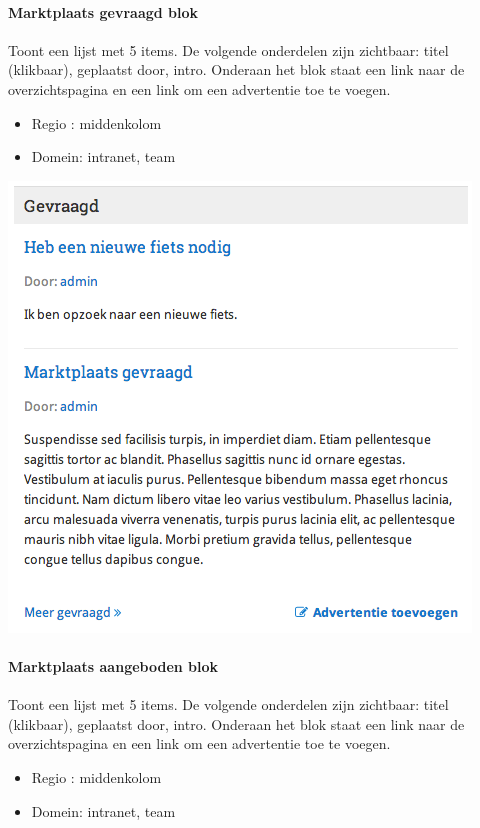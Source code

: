 \paragraph{Marktplaats gevraagd blok}

Toont een lijst met 5 items. De volgende onderdelen zijn zichtbaar: titel (klikbaar), geplaatst door, intro. Onderaan het blok staat een link naar de overzichtspagina en een link om een advertentie toe te voegen.

\begin{itemize}
\item Regio : middenkolom
\item Domein: intranet, team
\end{itemize}

\begin{center}
	\includegraphics[scale=0.5]{img/blokken/marktplaatsgevraagd.png}
\end{center}

\paragraph{Marktplaats aangeboden blok}

Toont een lijst met 5 items. De volgende onderdelen zijn zichtbaar: titel (klikbaar), geplaatst door, intro. Onderaan het blok staat een link naar de overzichtspagina en een link om een advertentie toe te voegen.

\begin{itemize}
\item Regio : middenkolom
\item Domein: intranet, team
\end{itemize}

